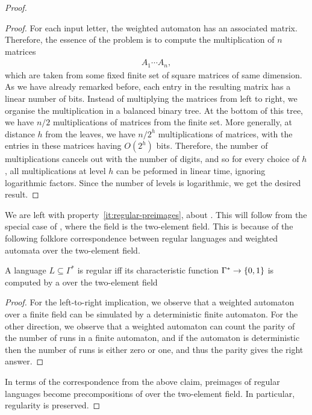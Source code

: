 \begin{proof}
\begin{proof}
        For each input letter, the weighted automaton has an associated matrix. Therefore, the essence of the  problem is to compute the multiplication of $n$ matrices 
        \begin{align*}
        A_1 \cdots A_n,
        \end{align*}
        which are taken from some fixed finite set of square matrices of same dimension. As we have already remarked before, each entry in the resulting matrix has a linear number of bits. Instead of multiplying the matrices from left to right, we organise the multiplication in a balanced binary tree. At the bottom of this tree, we have $n/2$ multiplications of matrices from the finite set. More generally, at distance $h$ from the leaves, we have $n  / 2^h$ multiplications of matrices, with the entries in these matrices having $O(2^h)$ bits.  Therefore, the number of multiplications cancels out with the number of digits, and so for every choice of $h$, all multiplications at level $h$ can be peformed in linear time, ignoring logarithmic factors. Since the number of levels is  logarithmic, we get the desired result.
    \end{proof}
    

    We are left with property~\ref{it:regular-preimages}, about . This will follow from the special case of ,
    where the field is the two-element field.  This is because of  the
    following  folklore correspondence between regular languages and weighted
    automata over the two-element field. 
        
        \begin{claim}\label{claim:regular-weighted-automata}
            A language $L \subseteq \Gamma^*$ is regular iff its characteristic
            function $\Gamma^* \to \{0,1\}$ is computed by a  over the two-element field 
        \end{claim}
        \begin{proof}
            For the left-to-right implication, we observe that a weighted
            automaton over a finite field can be simulated by a deterministic
            finite automaton. For the other direction, we observe that a
            weighted automaton can count the parity of  the number of runs in a
            finite automaton, and if the automaton is deterministic then the
            number of runs is either zero or one, and thus the parity gives the
            right answer.
        \end{proof}

        In terms of the correspondence from the above claim, preimages of
        regular languages become precompositions of  over the
        two-element field. In particular, regularity is preserved. 
\end{proof}

